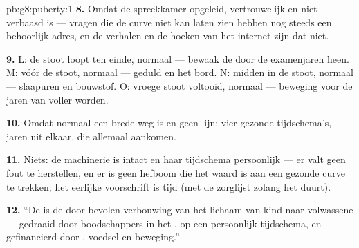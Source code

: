 \begin{solution}{pb:g8:puberty:1}
\textbf{8.} Omdat de spreekkamer opgeleid, vertrouwelijk en niet verbaasd
is --- vragen die de curve niet kan laten zien hebben nog steeds een
behoorlijk adres, en de verhalen en de hoeken van het internet zijn dat
niet.

\textbf{9.} L: de stoot loopt ten einde, normaal --- bewaak de  door
de examenjaren heen. M: vóór de stoot, normaal --- geduld en het bord. N:
midden in de stoot, normaal --- slaapuren en bouwstof. O: vroege stoot
voltooid, normaal --- beweging voor de jaren van voller worden.

\textbf{10.} Omdat normaal een brede weg is en geen lijn: vier gezonde
tijdschema's, jaren uit elkaar, die allemaal aankomen.

\textbf{11.} Niets: de machinerie is intact en haar tijdschema
persoonlijk --- er valt geen fout te herstellen, en er is geen hefboom die
het waard is aan een gezonde curve te trekken; het eerlijke voorschrift is
tijd (met de zorglijst zolang het duurt).

\textbf{12.} ``De  is de door  bevolen verbouwing van het
lichaam van kind naar volwassene --- gedraaid door boodschappers in het
, op een persoonlijk tijdschema, en gefinancierd door , voedsel
en beweging.''
\end{solution}
